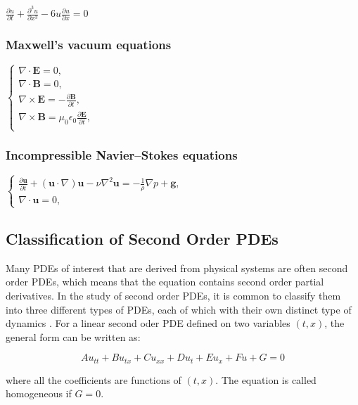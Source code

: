 $\frac{\partial u}{\partial t} + \frac{\partial^3 u}{\partial x^3} - 6 u \frac{\partial u}{\partial x} = 0$

\subsubsection*{Maxwell's vacuum equations}

$\begin{cases}
    \nabla \cdot \bm{E} = 0, & \\
    \nabla \cdot \bm{B} = 0, & \\
    \nabla \times \bm{E} = - \frac{\partial \bm{B}}{\partial t}, & \\
    \nabla \times \bm{B} = \mu_0 \epsilon_0 \frac{\partial \bm{E}}{\partial t}, & \\
\end{cases}$
    
\subsubsection*{Incompressible Navier–Stokes equations}

$\begin{cases}
    \frac{\partial \bm{u}}{\partial t} + (\bm{u} \cdot \nabla) \bm{u} - \nu \nabla^2 \bm{u} = - \frac{1}{\rho} \nabla p + \bm{g}, & \\
    \nabla \cdot \bm{u} = 0, & 
\end{cases}$

\subsection{Classification of Second Order PDEs}

Many PDEs of interest that are derived from physical systems are often second order PDEs, which means that the equation contains second order partial derivatives. In the study of second order PDEs, it is common to classify them into three different types of PDEs, each of which with their own distinct type of dynamics \cite{pdebookcourse2}. For a linear second oder PDE defined on two variables $(t, x)$, the general form can be written as:

\begin{equation}
    A u_{tt} + B u_{tx} + C u_{xx} + D u_{t} + E u_{x} + F u + G = 0
\end{equation}

\noindent where all the coefficients are functions of $(t, x)$. The equation is called homogeneous if $G = 0$.


